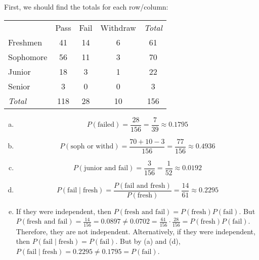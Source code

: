 \documentclass[11pt,letterpaper]{article}
\begin{document}
\sol First, we should find the totals for each row/column:
	\begin{table}[H]
	\centering
	\begin{tabular}{lcccc}
	& Pass & Fail & Withdraw & {\itshape Total} \\ \cline{2-4} 
	\multicolumn{1}{l|}{Freshmen} & \multicolumn{1}{c|}{41} & \multicolumn{1}{c|}{14} & \multicolumn{1}{c|}{6} & 61 \\ \cline{2-4} 
	\multicolumn{1}{l|}{Sophomore} & \multicolumn{1}{c|}{56} & \multicolumn{1}{c|}{11} & \multicolumn{1}{c|}{3} & 70 \\ \cline{2-4} 
	\multicolumn{1}{l|}{Junior} & \multicolumn{1}{c|}{18} & \multicolumn{1}{c|}{3} & \multicolumn{1}{c|}{1} & 22 \\ \cline{2-4} 
	\multicolumn{1}{l|}{Senior} & \multicolumn{1}{c|}{3} & \multicolumn{1}{c|}{0} & \multicolumn{1}{c|}{0} & 3 \\ \cline{2-4}
	{\itshape Total} & 118 & 28 & 10 & 156
	\end{tabular}
	\end{table}

\begin{enumerate}[(a)]
\item 
	\[
	P(\text{failed})= \dfrac{28}{156}= \dfrac{7}{39} \approx 0.1795
	\]

\item 
	\[
	P(\text{soph or withd})= \dfrac{70 + 10 - 3}{156}= \dfrac{77}{156} \approx 0.4936
	\]

\item 
	\[
	P(\text{junior and fail})= \dfrac{3}{156}= \dfrac{1}{52} \approx 0.0192
	\]

\item 
	\[
	P(\text{fail} \;|\; \text{fresh})= \dfrac{P(\text{fail and fresh})}{P(\text{fresh})}= \dfrac{14}{61} \approx 0.2295
	\]

\item If they were independent, then $P(\text{fresh and fail})= P(\text{fresh}) P(\text{fail})$. But $P(\text{fresh and fail})= \frac{14}{156}= 0.0897 \neq 0.0702= \frac{61}{156} \cdot \frac{28}{156}= P(\text{fresh}) P(\text{fail})$. Therefore, they are not independent. Alternatively, if they were independent, then $P(\text{fail} \;|\; \text{fresh})= P(\text{fail})$. But by (a) and (d), $P(\text{fail} \;|\; \text{fresh})= 0.2295 \neq 0.1795= P(\text{fail})$.
\end{enumerate}



\newpage
\end{document}
